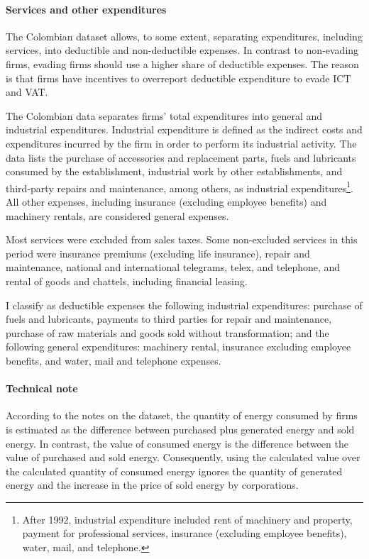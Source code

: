 \documentclass[
  12pt]{article}
\let\oldparagraph\paragraph
\renewcommand{\paragraph}[1]{\oldparagraph{#1}\mbox{}}
\theoremstyle{definition}
\theoremstyle{remark}
\begin{document}
\paragraph{Services and other
expenditures}\label{services-and-other-expenditures}

The Colombian dataset allows, to some extent, separating expenditures,
including services, into deductible and non-deductible expenses. In
contrast to non-evading firms, evading firms should use a higher share
of deductible expenses. The reason is that firms have incentives to
overreport deductible expenditure to evade ICT and VAT.

The Colombian data separates firms' total expenditures into general and
industrial expenditures. Industrial expenditure is defined as the
indirect costs and expenditures incurred by the firm in order to perform
its industrial activity. The data lists the purchase of accessories and
replacement parts, fuels and lubricants consumed by the establishment,
industrial work by other establishments, and third-party repairs and
maintenance, among others, as industrial expenditures\footnote{After
  1992, industrial expenditure included rent of machinery and property,
  payment for professional services, insurance (excluding employee
  benefits), water, mail, and telephone.}. All other expenses, including
insurance (excluding employee benefits) and machinery rentals, are
considered general expenses.

Most services were excluded from sales taxes. Some non-excluded services
in this period were insurance premiums (excluding life insurance),
repair and maintenance, national and international telegrams, telex, and
telephone, and rental of goods and chattels, including financial
leasing.

I classify as deductible expenses the following industrial expenditures:
purchase of fuels and lubricants, payments to third parties for repair
and maintenance, purchase of raw materials and goods sold without
transformation; and the following general expenditures: machinery
rental, insurance excluding employee benefits, and water, mail and
telephone expenses.

\paragraph{Technical note}\label{technical-note}

According to the notes on the dataset, the quantity of energy consumed
by firms is estimated as the difference between purchased plus generated
energy and sold energy. In contrast, the value of consumed energy is the
difference between the value of purchased and sold energy. Consequently,
using the calculated value over the calculated quantity of consumed
energy ignores the quantity of generated energy and the increase in the
price of sold energy by corporations.
\end{document}
